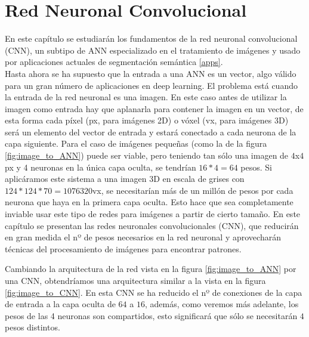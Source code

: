 \chapter{Red Neuronal Convolucional}\label{cnn}

En este capítulo se estudiarán los fundamentos de la red neuronal convolucional (CNN), un subtipo de ANN especializado en el tratamiento de imágenes y usado por aplicaciones actuales de segmentación semántica \ref{apps}.\\

Hasta ahora se ha supuesto que la entrada a una ANN es un vector, algo válido para un gran número de aplicaciones en deep learning. El problema está cuando la entrada de la red neuronal es una imagen. En este caso antes de utilizar la imagen como entrada hay que aplanarla para contener la imagen en un vector, de esta forma cada píxel (px, para imágenes 2D) o vóxel (vx, para imágenes 3D) será un elemento del vector de entrada y estará conectado a cada neurona de la capa siguiente. Para el caso de imágenes pequeñas (como la de la figura \ref{fig:image_to_ANN}) puede ser viable, pero teniendo tan sólo una imagen de $4$x$4$px y 4 neuronas en la única capa oculta, se tendrían $16*4=64$ pesos. Si aplicáramos este sistema a una imagen 3D en escala de grises con $124*124*70=1076320$vx, se necesitarían más de un millón de pesos por cada neurona que haya en la primera capa oculta. Esto hace que sea completamente inviable usar este tipo de redes para imágenes a partir de cierto tamaño. En este capítulo se presentan las redes neuronales convolucionales (CNN), que reducirán en gran medida el nº de pesos necesarios en la red neuronal y aprovecharán técnicas del procesamiento de imágenes para encontrar patrones.


Cambiando la arquitectura de la red vista en la figura \ref{fig:image_to_ANN} por una CNN, obtendríamos una arquitectura similar a la vista en la figura \ref{fig:image_to_CNN}. En esta CNN se ha reducido el nº de conexiones de la capa de entrada a la capa oculta de $64$ a $16$, además, como veremos más adelante, los pesos de las 4 neuronas son compartidos, esto significará que sólo se necesitarán $4$ pesos distintos.


